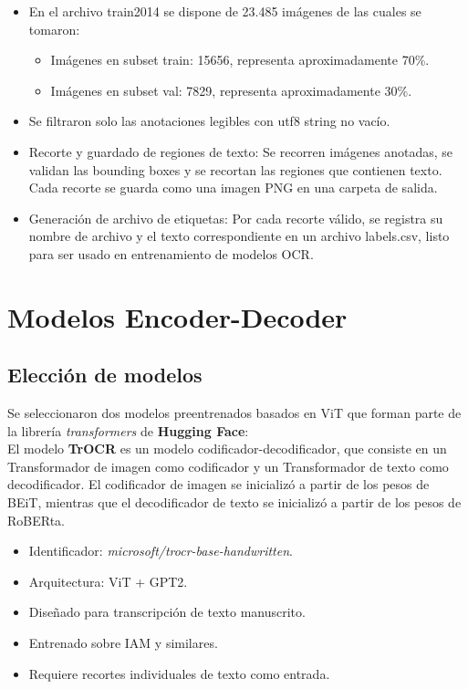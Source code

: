\documentclass[12pt]{article}
\begin{document}
\begin{itemize}
    \item En el archivo train2014 se dispone de 23.485 imágenes de las cuales se tomaron: 
     \begin{itemize}
        \item Imágenes en subset train: 15656, representa aproximadamente 70\%.
        \item Imágenes en subset val: 7829, representa aproximadamente 30\%.
     \end{itemize}
    \item Se filtraron solo las anotaciones legibles con utf8 string no vacío. 
    \item Recorte y guardado de regiones de texto: Se recorren imágenes anotadas,
     se validan las bounding boxes y se recortan las regiones que contienen texto. 
     Cada recorte se guarda como una imagen PNG en una carpeta de salida.
    \item Generación de archivo de etiquetas: Por cada recorte válido, se registra su nombre de 
    archivo y el texto correspondiente en un archivo labels.csv, listo para ser usado en 
    entrenamiento de modelos OCR.
\end{itemize}

\section{Modelos Encoder-Decoder}

\subsection{Elección de modelos}

Se seleccionaron dos modelos preentrenados basados en ViT que forman parte de la librería 
\textit{transformers} de \textbf{Hugging Face}: \\

El modelo \textbf{TrOCR} \cite{trocr} es un modelo codificador-decodificador, que consiste en un Transformador de imagen 
como codificador y un Transformador de texto como decodificador. El codificador de imagen se 
inicializó a partir de los pesos de BEiT, mientras que el decodificador de texto se inicializó a 
partir de los pesos de RoBERta. 

\begin{itemize}
    \item Identificador: \textit{microsoft/trocr-base-handwritten}.
    \item Arquitectura: ViT + GPT2.
    \item Diseñado para transcripción de texto manuscrito.
    \item Entrenado sobre IAM y similares.
    \item Requiere recortes individuales de texto como entrada.
\end{itemize}
    
\end{document}
